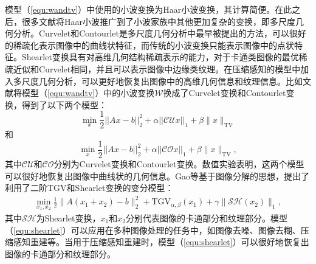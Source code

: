 模型（\ref{equ:wandtv}）中使用的小波变换为Haar小波变换\cite{stankovic2003haar}，其计算简便。在此之后，很多文献将Haar小波推广到了小波家族中其他更加复杂的变换，即多尺度几何分析。Curvelet\cite{candes2000curvelets}和Contourlet\cite{do2005contourlet}是多尺度几何分析中最早被提出的方法，可以很好的稀疏化表示图像中的曲线状特征，而传统的小波变换只能表示图像中的点状特征。Shearlet\cite{easley2008sparse}变换具有对高维几何结构稀疏表示的能力，对于卡通类图像的最优稀疏近似和Curvelet相同，并且可以表示图像中边缘类纹理。在压缩感知的模型中加入多尺度几何分析，可以更好地恢复出图像中的高维几何信息和纹理信息。比如文献\cite{qu2010combined,qu2010iterative}将模型（\ref{equ:wandtv}）中的小波变换$\mathcal{W}$换成了Curvelet变换和Contourlet变换，得到了以下两个模型：
\begin{equation}
	\min_x\frac{1}{2}||Ax-b||^2_2+\alpha ||\mathcal{CU}x||_1+\beta \|x\|_\mathrm{TV}
\end{equation}
和
\begin{equation}
	\min_x\frac{1}{2}||Ax-b||^2_2+\alpha ||\mathcal{CO}x||_1+\beta \|x\|_\mathrm{TV},
\end{equation}
其中$\mathcal{CU}$和$\mathcal{CO}$分别为Curvelet变换和Contourlet变换。数值实验表明，这两个模型可以很好地恢复出图像中曲线状的几何信息。Gao等\cite{infimaltgv}基于图像分解的思想，提出了利用了二阶TGV和Shearlet变换的变分模型：
\begin{equation}
	\begin{aligned}
		\min_{x_1,x_2}\frac{1}{2}\|A(x_1+x_2)-b\|^2_2+\mathrm{TGV}_{\alpha,\beta}(x_1)+\gamma\|\mathcal{SH}(x_2)\|_1,
	\end{aligned}
	\label{equ:shearlet}
\end{equation}
其中$\mathcal{SH}$为Shearlet变换，$x_1$和$x_2$分别代表图像的卡通部分和纹理部分。模型（\ref{equ:shearlet}）可以应用在多种图像处理的任务中，如图像去噪、图像去糊、压缩感知重建等。当用于压缩感知重建时，模型（\ref{equ:shearlet}）可以很好地恢复出图像的卡通部分和纹理部分。

